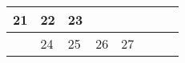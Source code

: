 {\begin{tabularx}{\linewidth}{|l!{\vrule width \myLenLineThicknessThick}*{7}{@{}X@{}|}}
      
      
        \begin{minipage}[t]{6mm}\centering{}21\end{minipage}
      
       & 
    
      
      
        \begin{minipage}[t]{6mm}\centering{}22\end{minipage}
      
       & 
    
      
      
        \begin{minipage}[t]{6mm}\centering{}23\end{minipage}
      
      
        \\  \hline 
      
    
  
  
  
  \hyperlink{week-2025-47}{} &
    
      
      
        \begin{minipage}[t]{6mm}\centering{}24\end{minipage}
      
       & 
    
      
      
        \begin{minipage}[t]{6mm}\centering{}25\end{minipage}
      
       & 
    
      
      
        \begin{minipage}[t]{6mm}\centering{}26\end{minipage}
      
       & 
    
      
      
        \begin{minipage}[t]{6mm}\centering{}27\end{minipage}
      
       & 
    
      
      

\end{tabularx}}
